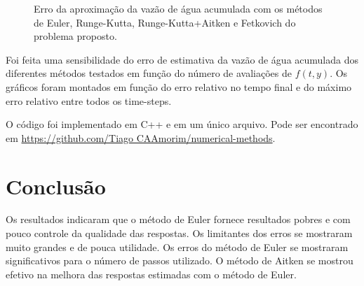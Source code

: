 \documentclass[final,5p]{elsarticle}
\numberwithin{equation}{section}
\begin{document}
        \begin{figure}[hbt!]
            \caption{Erro da aproximação da vazão de água acumulada com os métodos de Euler, Runge-Kutta, Runge-Kutta+Aitken e Fetkovich do problema proposto.}
            \label{fig:testeaq1errowe}
        \end{figure}

        Foi feita uma sensibilidade do erro de estimativa da vazão de água acumulada dos diferentes métodos testados em função do número de avaliações de $f(t,y)$. Os gráficos foram montados em função do erro relativo no tempo final e do máximo erro relativo entre todos os time-steps.


        O código foi implementado em C++ e em um único arquivo. Pode ser encontrado em \href{https://github.com/TiagoCAAmorim/numerical-methods/blob/main/07_RungeKutta/07_RungeKutta.cpp}{https://github.com/Tiago CAAmorim/numerical-methods}.

    \section{Conclusão}

        Os resultados indicaram que o método de Euler fornece resultados pobres e com pouco controle da qualidade das respostas. Os limitantes dos erros se mostraram muito grandes e de pouca utilidade. Os erros do método de Euler se mostraram significativos para o número de passos utilizado. O método de Aitken se mostrou efetivo na melhora das respostas estimadas com o método de Euler.
\end{document}

